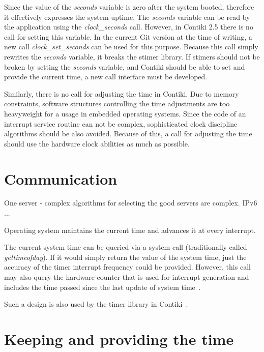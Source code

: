 Since the value of the {\it{seconds}} variable is zero after the system booted,
therefore it effectively expresses the system uptime.
The {\it{seconds}} variable can be read by the application using the {\it{clock\_seconds}} call.
However, in Contiki 2.5 there is no call for setting this variable.
In the current Git version at the time of writing, a new call {\it{clock\_set\_seconds}}
can be used for this purpose.
Because this call simply rewrites the {\it{seconds}} variable, it breaks the stimer library.
If stimers should not be broken by setting the {\it{seconds}} variable,
and Contiki should be able to set and provide the current time,
a new call interface must be developed.

Similarly, there is no call for adjusting the time in Contiki.
Due to memory constraints, software structures controlling the time adjustments are too heavyweight
for a usage in embedded operating systems.
Since the code of an interrupt service routine can not be complex,
sophisticated clock discipline algorithms should be also avoided.
Because of this, a call for adjusting the time should use the hardware clock abilities as much as possible.


\section{Communication}
One server - complex algorithms for selecting the good servers are complex.
IPv6
...


Operating system maintains the current time and advances it at every interrupt.


The current system time can be queried via a system call
(traditionally called {\it{gettimeofday}}).
If it would simply return the value of the system time,
just the accuracy of the timer interrupt frequency could be provided.
However, this call may also query the hardware counter that is used for
interrupt generation and includes the time passed since
the last update of system time~\cite{thesis-beat}.



Such a design is also used by the timer library in Contiki~\cite{contiki-docs}.



\section{Keeping and providing the time}\label{sec:system-keeping-and-providing}



